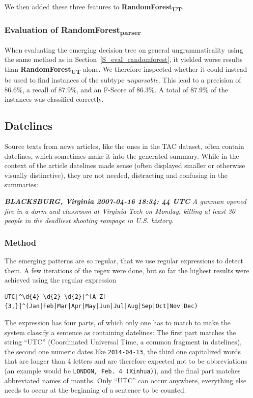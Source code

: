 \documentclass[a4paper,10pt]{scrartcl}
\theoremstyle{style}
\begin{document}
We then added these three features to \textbf{RandomForest\textsubscript{UT}}.

\subsubsection{Evaluation of RandomForest\textsubscript{parser}}

When evaluating the emerging decision tree on general ungrammaticality using the same method as in Section~\ref{S_eval_randomforest}, it yielded worse results than \textbf{RandomForest\textsubscript{UT}} alone. We therefore inspected whether it could instead be used to find instances of the subtype \textit{unparsable}. This lead to a precision of 86.6\%, a recall of 87.9\%, and an F-Score of 86.3\%. A total of 87.9\% of the instances was classified correctly.

\subsection{Datelines}
Source texts from news articles, like the ones in the TAC dataset, often contain datelines, which sometimes make it into the generated summary. While in the context of the article datelines made sense (often displayed smaller or otherwise visually distinctive), they are not needed, distracting and confusing in the summaries:

\textit{\textbf{BLACKSBURG, Virginia 2007-04-16 18:34: 44 UTC} A gunman opened fire in a dorm and classroom at Virginia Tech on Monday, killing at least 30 people in the deadliest shooting rampage in U.S. history.}



\subsubsection{Method}
The emerging patterns are so regular, that we use regular expressions to detect them. A few iterations of the regex were done, but so far the highest results were achieved using the regular expression

\begin{lstlisting}
UTC|^\d{4}-\d{2}-\d{2}|^[A-Z]{3,}|^(Jan|Feb|Mar|Apr|May|Jun|Jul|Aug|Sep|Oct|Nov|Dec)
\end{lstlisting}

The expression has four parts, of which only one has to match to make the system classify a sentence as containing datelines: The first part matches the string ``UTC'' (Coordinated Universal Time, a common fragment in datelines), the second one numeric dates like \texttt{2014-04-13}, the third one capitalized words that are longer than 4 letters and are therefore expected not to be abbreviations (an example would be \texttt{LONDON, Feb. 4 (Xinhua)}), and the final part matches abbreviated names of months. Only ``UTC'' can occur anywhere, everything else needs to occur at the beginning of a sentence to be counted.
\end{document}
